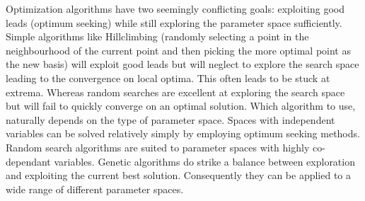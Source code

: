 Optimization algorithms have two seemingly conflicting goals: exploiting good leads (optimum seeking) while still exploring the parameter space sufficiently. Simple algorithms like Hillclimbing (randomly selecting a point in the neighbourhood of the current point and then picking the more optimal point as the new basis) will exploit good leads but will neglect to explore the search space leading to the convergence on local optima. This often leads to be stuck at extrema. Whereas random searches are excellent at exploring the search space but will fail to quickly converge on an optimal solution. Which algorithm to use, naturally depends on the type of parameter space. Spaces with independent variables can be solved relatively simply by employing optimum seeking methods. Random search algorithms are suited to parameter spaces with highly co-dependant variables. Genetic algorithms do strike a balance between exploration and exploiting the current best solution. Consequently they can be applied to a wide range of different parameter spaces.

